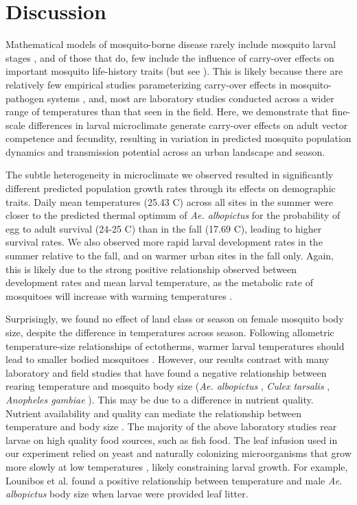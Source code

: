 \documentclass{bmcart}
\begin{document}
\section*{Discussion}

Mathematical models of mosquito-borne disease rarely include mosquito larval stages \citep{reiner2013}, and of those that do, few include the influence of carry-over effects on important mosquito life-history traits (but see \citep{roux2015a}). This is likely because there are relatively few empirical studies parameterizing carry-over effects in mosquito-pathogen systems \citep{parham2015}, and, most are laboratory studies conducted across a wider range of temperatures than that seen in the field. Here, we demonstrate that fine-scale differences in larval microclimate generate carry-over effects on adult vector competence and fecundity, resulting in variation in predicted mosquito population dynamics and transmission potential across an urban landscape and season.

The subtle heterogeneity in microclimate we observed resulted in significantly different predicted population growth rates through its effects on demographic traits. Daily mean temperatures (25.43 \degree C) across all sites in the summer were closer to the predicted thermal optimum of \textit{Ae. albopictus} for the probability of egg to adult survival (24-25 \degree C) \citep{mordecai2017} than in the fall (17.69 \degree C), leading to higher survival rates. We also observed more rapid larval development rates in the summer relative to the fall, and on warmer urban sites in the fall only. Again, this is likely due to the strong positive relationship observed between development rates and  mean larval temperature, as the metabolic rate of mosquitoes will increase with warming temperatures \citep{delatte2009}.

Surprisingly, we found no effect of land class or season on female mosquito body size, despite the difference in temperatures across season. Following allometric temperature-size relationships of ectotherms, warmer larval temperatures should lead to smaller bodied mosquitoes \citep{angilleta2004}. However, our results contrast with many laboratory and field studies that have found a negative relationship between rearing temperature and mosquito body size (\textit{Ae. albopictus} \citep{reiskind2012a, murdock2017}, \textit{Culex tarsalis} \citep{dodson2012}, \textit{Anopheles gambiae} \citep{koella1996}). This may be due to a difference in nutrient quality. Nutrient availability and quality can mediate the relationship between temperature and body size \citep{farjana2011}. The majority of the above laboratory studies rear larvae on high quality food sources, such as fish food. The leaf infusion used in our experiment relied on yeast and naturally colonizing microorganisms that grow more slowly at low temperatures \citep{ratkowsky1982}, likely constraining larval growth. For example, Lounibos et al. \citep{lounibos2002} found a positive relationship between temperature and male \textit{Ae. albopictus} body size when larvae were provided leaf litter.
\end{document}
